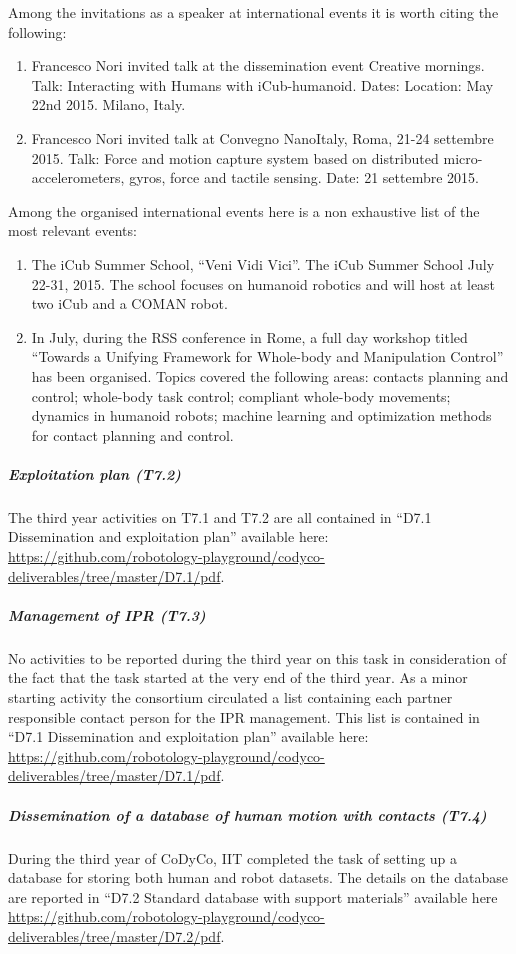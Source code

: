 Among the invitations as a speaker at international events it is worth citing the following:

\begin{enumerate}

\item Francesco Nori invited talk at the dissemination event Creative mornings. Talk: Interacting with Humans with iCub-humanoid. Dates: Location: May 22nd 2015. Milano, Italy.

\item Francesco Nori invited talk at Convegno NanoItaly, Roma, 21-24 settembre 2015. Talk: Force and motion capture system
based on distributed micro-accelerometers, gyros, force and tactile sensing. Date: 21 settembre 2015.
\end{enumerate} 

Among the organised international events here is a non exhaustive list of the most relevant events:

\begin{enumerate}

\item The iCub Summer School, ``Veni Vidi Vici''. The iCub Summer School July 22-31, 2015. The school focuses on humanoid robotics and will host at least two iCub and a COMAN robot. 

\item In July, during the RSS conference in Rome, a full day workshop titled ``Towards a Unifying Framework for Whole-body and Manipulation Control'' has been organised. Topics covered the following areas: contacts planning and control; whole-body task control; compliant whole-body movements; dynamics in humanoid robots; machine learning and optimization methods for contact planning and control.
\end{enumerate} 



\subparagraph*{Exploitation plan (T7.2)}

The third year activities on T7.1 and T7.2 are all contained in ``D7.1 Dissemination and exploitation plan'' available here: \url{https://github.com/robotology-playground/codyco-deliverables/tree/master/D7.1/pdf}.

\subparagraph*{Management of IPR (T7.3)}

No activities to be reported during the third year on this task in consideration of the fact that the task started at the very end of the third year. As a minor starting activity the consortium circulated a list containing each partner responsible contact person for the IPR management. This list is contained in ``D7.1 Dissemination and exploitation plan'' available here: \url{https://github.com/robotology-playground/codyco-deliverables/tree/master/D7.1/pdf}.

\subparagraph*{Dissemination of a database of human motion with contacts (T7.4)}

During the third year of CoDyCo, IIT completed the task of setting up a database for storing both human and robot datasets. The details on the database are reported in ``D7.2 Standard database with support materials'' available here \url{https://github.com/robotology-playground/codyco-deliverables/tree/master/D7.2/pdf}. 

